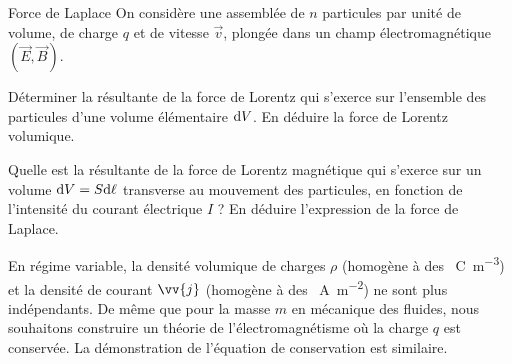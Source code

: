 \documentclass[12pt,fancy]{cours}
\begin{document}
\begin{exemple}{Force de Laplace}
  On considère une assemblée de $n$ particules par unité de volume, de charge $q$ et de vitesse $\Vec{v}$, plongée dans un champ électromagnétique $(\Vec{E},\Vec{B})$. 
  \begin{quest}
    \item	Déterminer la résultante de la force de Lorentz qui s’exerce sur l’ensemble des particules d’une volume élémentaire $\mathrm{d} V$. En déduire la force de Lorentz volumique.
    \item Quelle est la résultante de la force de Lorentz magnétique qui s’exerce sur un volume $\mathrm{d} V = S\mathrm{d}\ell$ transverse au mouvement des particules, en fonction de l’intensité du courant électrique $I$ ? En déduire l’expression de la force de Laplace.
  
  \end{quest}
\end{exemple}
  


En régime variable, la densité volumique de charges $\rho$ (homogène à des \SI{}{C.m^{-3}}) et la densité de courant $\vv{j}$ (homogène à des \SI{}{A.m^{-2}}) ne sont  plus indépendants. De même que pour la masse $m$ en mécanique des fluides, nous souhaitons construire un théorie de l’électromagnétisme où la charge $q$ est conservée. La démonstration de l’équation de conservation est similaire.
\end{document}
